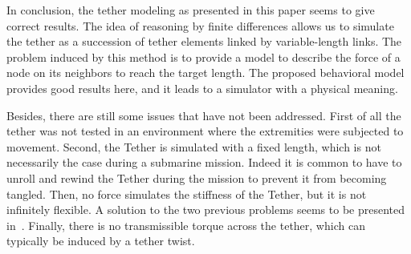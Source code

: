 In conclusion, the tether modeling as presented in this paper seems to give correct results. The idea of reasoning by finite differences allows us to simulate the tether as a succession of tether elements linked by variable-length links. The problem induced by this method is to provide a model to describe the force of a node on its neighbors to reach the target length. The proposed behavioral model provides good results here, and it leads to a simulator with a physical meaning.

Besides, there are still some issues that have not been addressed. First of all the tether was not tested in an environment where the extremities were subjected to movement. Second, the Tether is simulated with a fixed length, which is not necessarily the case during a submarine mission. Indeed it is common to have to unroll and rewind the Tether during the mission to prevent it from becoming tangled. Then, no force simulates the stiffness of the Tether, but it is not infinitely flexible. A solution to the two previous problems seems to be presented in~\cite{ganoni_unreal}. Finally, there is no transmissible torque across the tether, which can typically be induced by a tether twist.